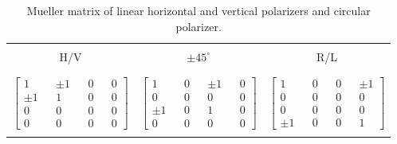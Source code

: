 \begin{table}
\small
\begin{center}
\caption{Mueller matrix of linear horizontal and vertical polarizers and circular polarizer.}
\begin{tabular}{ c c c }
    \hline
    & & \\[-2.5ex]
    H/V & $\pm 45^{\circ}$ & R/L\\
	& & \\[-2.5ex]    
    \hline   
    & & \\[-1.5ex] 
   $\begin{bmatrix}
    1 & & \pm 1 & & 0 & & 0 \\  \pm 1 & & 1 & & 0 & & 0 \\  0 & & 0 & & 0 & & 0 \\  0 & & 0 & & 0 & & 0     
   \end{bmatrix}$ &    
   $\begin{bmatrix}
   1 & & 0 & & \pm 1 & & 0 \\  0 & & 0 & & 0 & & 0 \\  \pm 1 & & 0 & & 1 & & 0 \\  0 & & 0 & & 0 & & 0   
   \end{bmatrix}$& 
   $\begin{bmatrix}
   1 & & 0 & & 0 & & \pm 1 \\  0 & & 0 & & 0 & & 0 \\  0 & & 0 & & 0 & & 0 \\  \pm 1 & & 0 & & 0 & & 1     
   \end{bmatrix}$\\   
    &  &    \\
       \hline   
  \end{tabular}
  \label{Tab:Chp4T3}
  \end{center}
\end{table}